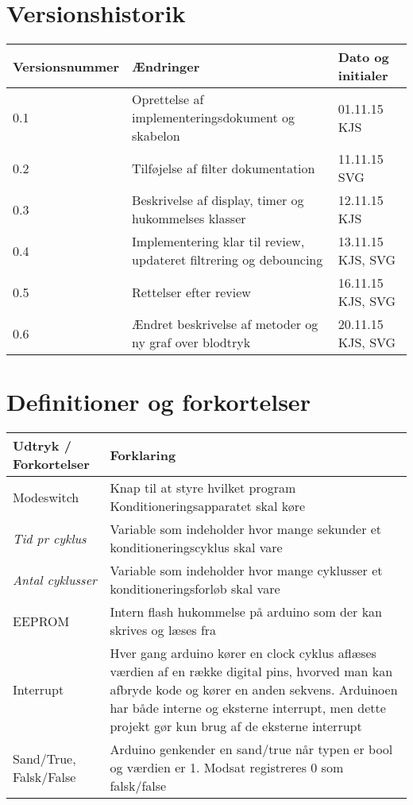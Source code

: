 	\newpage
	\section{Versionshistorik}
	\begin{longtable}{ |p{} |p{}| p{}|  } 
		\hline
		\rowcolor{usDef}
		\textbf{Versionsnummer} &  \textbf{Ændringer} & \textbf{Dato og initialer} \\
		\hline
		0.1 & Oprettelse af implementeringsdokument og skabelon & 01.11.15 KJS \\
		\hline
		0.2 & Tilføjelse af filter dokumentation & 11.11.15 SVG \\
		\hline
		0.3 & Beskrivelse af display, timer og hukommelses klasser & 12.11.15 KJS \\
		\hline
		0.4 &  Implementering klar til review, updateret filtrering og debouncing & 13.11.15 KJS, SVG \\
		\hline
		0.5 &  Rettelser efter review & 16.11.15 KJS, SVG \\
		\hline
		0.6 &  Ændret beskrivelse af metoder og ny graf over blodtryk & 20.11.15 KJS, SVG \\
		\hline
	\end{longtable}
	
	\section{Definitioner og forkortelser}
	\begin{longtable}{ |p{} |p{}| } 
		\hline
		\rowcolor{usDef}
		\textbf{Udtryk / Forkortelser} &  \textbf{Forklaring} \\
		\hline
		Modeswitch & Knap til at styre hvilket program Konditioneringsapparatet skal køre \\
		\hline
		\textit{Tid pr cyklus} & Variable som indeholder hvor mange sekunder et konditioneringscyklus skal vare \\
		\hline
		\textit{Antal cyklusser} & Variable som indeholder hvor mange cyklusser et konditioneringsforløb skal vare \\
		\hline
		EEPROM & Intern flash hukommelse på arduino som der kan skrives og læses fra \\
		\hline
		Interrupt & Hver gang arduino kører en clock cyklus aflæses værdien af en række digital pins, hvorved man kan afbryde kode og kører en anden sekvens. Arduinoen har både interne og eksterne interrupt, men dette projekt gør kun brug af de eksterne interrupt \\
		\hline
		Sand/True, Falsk/False & Arduino genkender en sand/true når typen er bool og værdien er 1. Modsat registreres 0 som falsk/false \\
		\hline
	\end{longtable}